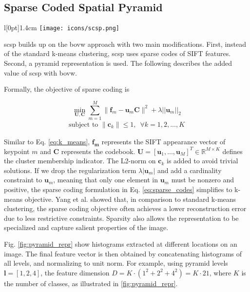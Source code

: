 \subsection{Sparse Coded Spatial Pyramid} \label{scp}
\begingroup
\setlength\intextsep{0pt}
\begin{wrapfigure}[4]{l}[0pt]{1.4cm}
\texttt{[image: icons/scsp.png]}
\end{wrapfigure}

\gls{scsp} \cite{lazebnik09} builds up on the \gls{bovw} approach with two main modifications.
First, instead of the standard k-means clustering, \gls{scsp} uses sparse codes of SIFT features.
Second, a pyramid representation is used.
The following describes the added value of \gls{scsp} with \gls{bovw}.

Formally, the objective of sparse coding is

\begin{equation}
  \min_{\boldsymbol{U,C}} \sum_{m=1}^M \|\boldsymbol{f}_m - \boldsymbol{u}_m \boldsymbol{C}\|^2 + \lambda ||\boldsymbol{u}_m||_{2}
  \label{eq:sparse_codes} 
\end{equation}
\begin{align*}
  \textrm{subject to } \|\boldsymbol{c}_k\| \leq 1, \hspace{6pt} \forall{k} = 1,2,...,K
\end{align*}

Similar to Eq. \ref{eq:k_means}, $\boldsymbol{f_m}$ represents the SIFT appearance vector of keypoint $m$ and $\boldsymbol{C}$ represents the codebook.
$\boldsymbol{U} = [\boldsymbol{u}_1,...,\boldsymbol{u}_M]^T \in \mathbb{R}^{M \times K}$ defines the cluster membership indicator.
The L2-norm on $\boldsymbol{c}_k$ is added to avoid trivial solutions.
If we drop the regularization term $\lambda |\boldsymbol{u}_m|$ and add a cardinality constraint to $\boldsymbol{u}_m$, meaning that only one element in $\boldsymbol{u}_m$ must be nonzero and positive, the sparse coding formulation in Eq. \ref{eq:sparse_codes} simplifies to k-means objective.
Yang et al. \cite{yang09} showed that, in comparison to standard k-means clustering, the sparse coding objective often achieves a lower reconstruction error due to less restrictive constraints.
Sparsity also allows the representation to be specialized and capture salient properties of the image.

Fig. \ref{fig:pyramid_repr} show histograms extracted at different locations on an image.
The final feature vector is then obtained by concatenating histograms of all levels, and normalizing to unit norm.
For example, using pyramid levels $\boldsymbol{l} = [1,2,4]$, the feature dimension $D = K \cdot (1^2 + 2^2 + 4^2) = K \cdot 21$, where $K$ is the number of classes, as illustrated in \ref{fig:pyramid_repr}.

